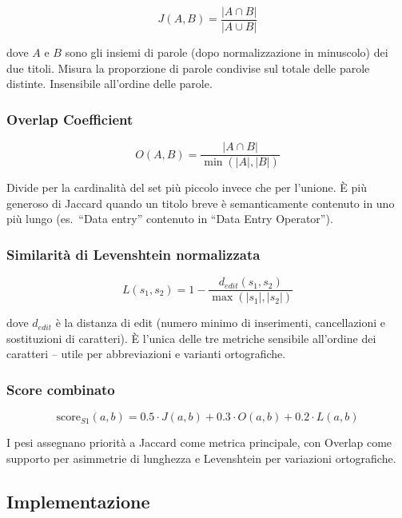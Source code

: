 \documentclass[12pt, a4paper]{report}
\begin{document}
\begin{equation}
J(A, B) = \frac{|A \cap B|}{|A \cup B|}
\end{equation}

dove $A$ e $B$ sono gli insiemi di parole (dopo normalizzazione in
minuscolo) dei due titoli. Misura la proporzione di parole condivise
sul totale delle parole distinte. Insensibile all'ordine delle parole.

\subsubsection{Overlap Coefficient}

\begin{equation}
O(A, B) = \frac{|A \cap B|}{\min(|A|, |B|)}
\end{equation}

Divide per la cardinalità del set più piccolo invece che per
l'unione. È più generoso di Jaccard quando un titolo breve è
semanticamente contenuto in uno più lungo (es.\ ``Data entry''
contenuto in ``Data Entry Operator'').
\newpage
\subsubsection{Similarità di Levenshtein normalizzata}

\begin{equation}
L(s_1, s_2) = 1 - \frac{d_{edit}(s_1, s_2)}{\max(|s_1|, |s_2|)}
\end{equation}

dove $d_{edit}$ è la distanza di edit (numero minimo di inserimenti,
cancellazioni e sostituzioni di caratteri). È l'unica delle tre
metriche sensibile all'ordine dei caratteri -- utile per abbreviazioni
e varianti ortografiche.

\subsubsection{Score combinato}

\begin{equation}
\text{score}_{S1}(a, b) = 0.5 \cdot J(a, b) + 0.3 \cdot O(a, b) + 0.2 \cdot L(a, b)
\end{equation}

I pesi assegnano priorità a Jaccard come metrica principale, con
Overlap come supporto per asimmetrie di lunghezza e Levenshtein per
variazioni ortografiche.

\subsection{Implementazione}
\end{document}
